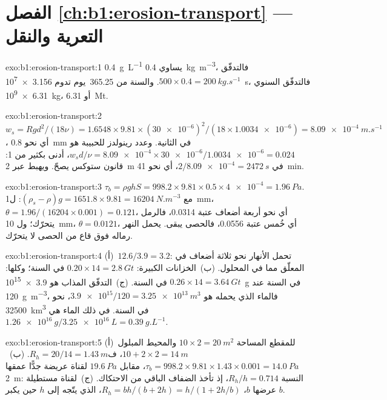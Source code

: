 \section*{الفصل \ref{ch:b1:erosion-transport} --- التعرية والنقل}

\begin{solution}{exo:b1:erosion-transport:1}
\qty{0.4}{g.L^{-1}} يساوي \qty{0.4}{kg.m^{-3}}، فالتدفّق $500 \times 0.4 =
\qty{200}{kg.s^{-1}}$. والسنة من \num{365.25}~يوم تدوم
\qty{3.156e7}{s}، فالتدفّق السنوي \qty{6.31e9}{kg}، أو
\qty{6.31}{Mt}.
\end{solution}

\begin{solution}{exo:b1:erosion-transport:2}
$w_s = R g d^2/(18\nu) = 1.6548 \times 9.81 \times (\num{30e-6})^2/(18 \times
\num{1.0034e-6}) = \qty{8.09e-4}{m.s^{-1}}$، أي نحو \qty{0.8}{mm} في الثانية. وعدد رينولدز للحبيبة هو $w_s d/\nu = \num{8.09e-4} \times
\num{30e-6}/\num{1.0034e-6} = 0.024$، أدنى بكثير من 1: قانون ستوكس يصحّ. ويهبط عبر \qty{2}{m} في $2/\num{8.09e-4} = \qty{2472}{s}$، أي نحو
\qty{41}{min}.
\end{solution}

\begin{solution}{exo:b1:erosion-transport:3}
$\tau_b = \rho g h S = 998.2 \times 9.81 \times 0.5 \times \num{4e-4} =
\qty{1.96}{Pa}$. مع $(\rho_s - \rho) g = 1651.8 \times 9.81 =
\qty{16204}{N.m^{-3}}$: ل\qty{1}{mm}، $\theta = 1.96/(16204 \times 0.001) =
0.121$، أي نحو أربعة أضعاف عتبة \num{0.0314}، فالرمل يتحرّك؛ ول
\qty{10}{mm}، $\theta = 0.0121$، أي خُمس عتبة \num{0.0556}، فالحصى يبقى. يحمل النهر رماله فوق قاع من الحصى لا يتحرّك.
\end{solution}

\begin{solution}{exo:b1:erosion-transport:4}
(أ)~$12.6/3.9 = 3.2$: تحمل الأنهار نحو ثلاثة أضعاف في المعلّق مما في المحلول. (ب)~الخزانات الكبيرة: $0.20 \times 14 = \qty{2.8}{Gt}$ في السنة؛ وكلها: $0.26 \times 14 = \qty{3.64}{Gt}$ في السنة. (ج)~التدفّق المذاب هو \qty{3.9e15}{g} في السنة عند \qty{120}{g.m^{-3}}، فالماء الذي يحمله هو
$\num{3.9e15}/120 = \qty{3.25e13}{m^3}$، نحو \qty{32500}{km^3} في السنة.  في ذلك الماء هي $\qty{1.26e16}{g}/\qty{3.25e16}{L} =
\qty{0.39}{g.L^{-1}}$.
\end{solution}

\begin{solution}{exo:b1:erosion-transport:5}
(أ)~للمقطع المساحة $10 \times 2 = \qty{20}{m^2}$ والمحيط المبلول $10 + 2 \times 2 = \qty{14}{m}$، ف$R_h = 20/14 = \qty{1.43}{m}$. (ب)~$\tau_b = 998.2 \times 9.81 \times 1.43 \times 0.001 = \qty{14.0}{Pa}$، مقابل $\qty{19.6}{Pa}$ لقناة عريضة جدًّا عمقها \qty{2}{m}: النسبة $R_h/h = 0.714$، إذ تأخذ الضفاف الباقي من الاحتكاك. (ج)~لقناة مستطيلة عرضها $b$، $R_h = bh/(b + 2h) = h/(1 + 2h/b)$، الذي يتّجه إلى $h$ حين يكبر $b$.
\end{solution}

